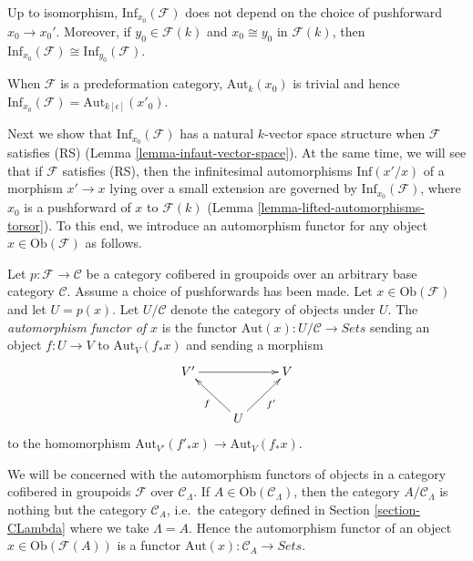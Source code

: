 \begin{remark}
\label{remark-choice-pushforward-immaterial-infinitesimal-aut}
Up to isomorphism, $\text{Inf}_{x_0}(\mathcal{F})$ does not depend on the 
choice of pushforward $x_0 \to x_0'$.  Moreover, if $y_0 \in \mathcal 
F(k)$ and $x_0 \cong y_0$ in $\mathcal{F}(k)$, then 
$\text{Inf}_{x_0}(\mathcal{F}) \cong \text{Inf}_{y_0}(\mathcal{F})$.
\end{remark}

\begin{remark}
\label{remark-trivial-aut-point}
When $\mathcal{F}$ is a predeformation category, $\text{Aut}_{k}(x_0)$ is 
trivial and hence $\text{Inf}_{x_0}(\mathcal{F}) = 
\text{Aut}_{k[\epsilon]}(x'_0)$.
\end{remark}

\noindent
Next we show that $\text{Inf}_{x_0}(\mathcal{F})$ has a natural $k$-vector 
space structure when $\mathcal{F}$ satisfies (RS) (Lemma 
\ref{lemma-infaut-vector-space}).  At the same time, we will see that if 
$\mathcal{F}$ satisfies (RS), then the infinitesimal automorphisms 
$\text{Inf}(x'/x)$ of a morphism $x' \to x$ lying over a small 
extension are governed by $\text{Inf}_{x_0}(\mathcal{F})$, where $x_0$ is 
a pushforward of $x$ to $\mathcal{F}(k)$ (Lemma 
\ref{lemma-lifted-automorphisms-torsor}).  To this end, we introduce an 
automorphism functor for any object $x \in \text{Ob}(\mathcal{F})$ as 
follows.

\begin{definition}
\label{definition-automorphism-functor}
Let $p: \mathcal{F} \to \mathcal{C}$ be a category cofibered in groupoids 
over an arbitrary base category $\mathcal{C}$. Assume a choice of pushforwards 
has been made.  Let $x \in \text{Ob}(\mathcal{F})$ and let $U = p(x)$.  
Let $U/\mathcal{C}$ denote the category of objects under $U$. The 
{\it automorphism functor of $x$} is the functor $\text{Aut}(x): 
U/\mathcal{C} \to \textit{Sets}$ sending an object $f: U 
\to V$ to $\text{Aut}_{V}(f_*x)$ and sending a morphism
\[
\xymatrix{
V' \ar[rr] &                    & V\\
          & U \ar[ul]^{f}  \ar[ur]_{f'} & 
}
\]
to the homomorphism $\text{Aut}_{V'}(f'_*x) \to 
\text{Aut}_{V}(f_*x)$.
\end{definition}

\noindent 
We will be concerned with the automorphism functors of objects in a category 
cofibered in groupoids $\mathcal{F}$ over $\mathcal{C}_\Lambda$.  If $A \in 
\text{Ob}(\mathcal{C}_\Lambda)$, then the category $A/\mathcal{C}_\Lambda$ is 
nothing but the category $\mathcal{C}_{A}$, i.e.\ the category defined in 
Section \ref{section-CLambda}
where we take $\Lambda = A$.  Hence the 
automorphism functor of an object $x \in \text{Ob}(\mathcal{F}(A))$ is a
functor 
$\text{Aut}(x): \mathcal{C}_{A} \to \textit{Sets}$.

